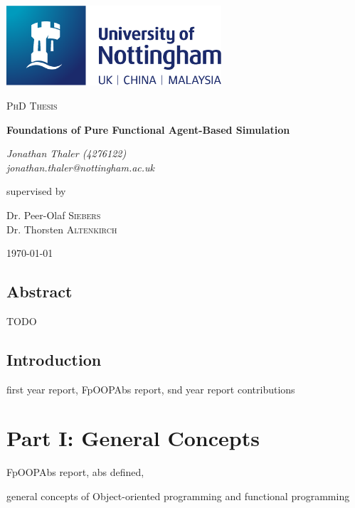 \documentclass[oneside]{book}
\begin{document}
\begin{titlepage}
	\centering
	\includegraphics[width=0.60\textwidth]{../logo/UoN_Primary_Logo_RGB.png}\par\vspace{1cm}
	{\scshape\Large PhD Thesis\par}
	\vspace{1.5cm}
	{\huge\bfseries Foundations of Pure Functional Agent-Based Simulation\par}
	\vspace{2cm}
	{\Large\itshape Jonathan Thaler (4276122) \\ jonathan.thaler@nottingham.ac.uk \par}
	\vfill
	supervised by\par
	Dr. Peer-Olaf \textsc{Siebers} \\
	Dr. Thorsten \textsc{Altenkirch}

	\vfill

	{\large \today\par}
\end{titlepage}

\cleardoublepage

\section*{Abstract}
TODO

\clearpage
\tableofcontents
\clearpage

\section{Introduction}
first year report,
FpOOPAbs report,
snd year report
contributions

\chapter*{Part I: General Concepts}
FpOOPAbs report,
abs defined,

general concepts of Object-oriented programming and functional programming
\end{document}
